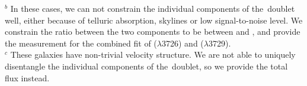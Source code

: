 \begin{longtab}
\begin{landscape}
\begin{minipage}{8.0in}
{$^{b}$ In these cases, we can not constrain the individual components of the  \oii\,doublet well, either because of telluric absorption, skylines or low signal-to-noise level. We constrain the ratio between the two components to be between  and , and provide the measurement for the combined fit of \oii($\lambda$3726) and \oii($\lambda$3729).\\
$^{c}$ These galaxies have non-trivial velocity structure. We are not able to uniquely disentangle the individual components of the \oii\,doublet, so we provide the total \oii\,flux instead.}
\end{minipage}
\end{landscape}
\end{longtab}
